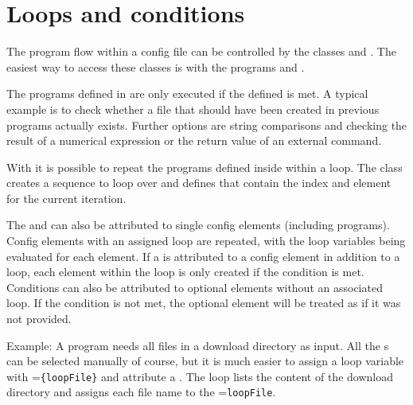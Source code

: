 \section{Loops and conditions}\label{general.loopsAndConditions}
The program flow within a config file can be controlled by the classes 
and . The easiest way to access these classes is with the programs
 and .

The programs defined in  are only executed if the defined
 is met. A typical example is to check whether a file that
should have been created in previous programs actually exists. Further options are string comparisons and
checking the result of a numerical expression or the return value of an external command.

With  it is possible to repeat the programs defined inside within a loop.
The class  creates a sequence to loop over and defines 
that contain the index and element for the current iteration.

The  and  can also be attributed to single
config elements (including programs). Config elements with an assigned loop are repeated, with the loop variables
being evaluated for each element. If a  is attributed to a config element
in addition to a loop, each element within the loop is only created if the condition is met. Conditions can also
be attributed to optional elements without an associated loop.
If the condition is not met, the optional element will be treated as if it was not provided.

Example: A program needs all files in a download directory as input.
All the s can be selected manually of course, but it is much easier to assign
a loop variable with =\verb|{loopFile}| and attribute a
.
The loop lists the content of the download directory and assigns each file name to the
=\verb|loopFile|.
